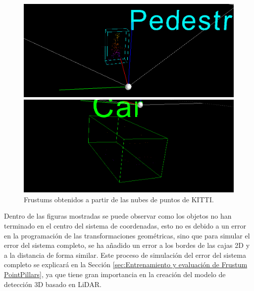 \begin{figure}[H]
	\begin{minipage}{0.495\textwidth}
		\centering
		\includegraphics[width=1\linewidth]{Book/figures/7_roi/kitti_pcl_frustum_0.png}
	\end{minipage}\hfill
	\begin{minipage}{0.495\textwidth}
		\centering
		\includegraphics[width=1\linewidth]{Book/figures/7_roi/kitti_pcl_frustum_2.png}
	\end{minipage}
	\caption{Frustums obtenidos a partir de las nubes de puntos de KITTI.}
	\label{fig:Frustums obtenidos a partir de las nubes de puntos de KITTI.}
\end{figure}

Dentro de las figuras mostradas se puede observar como los objetos no han terminado en el centro del sistema de coordenadas, esto no es debido a un error en la programación de las transformaciones geométricas, sino que para simular el error del sistema completo, se ha añadido un error a los bordes de las cajas 2D y a la distancia de forma similar. Este proceso de simulación del error del sistema completo se explicará en la Sección \ref{sec:Entrenamiento y evaluación de Frustum PointPillars}, ya que tiene gran importancia en la creación del modelo de detección 3D basado en \ac{LiDAR}.